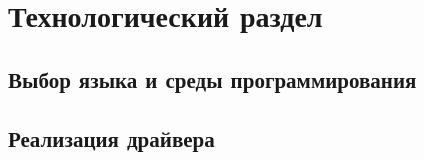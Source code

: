 \section{Технологический раздел}

\subsection{Выбор языка и среды программирования}

\subsection{Реализация драйвера}
